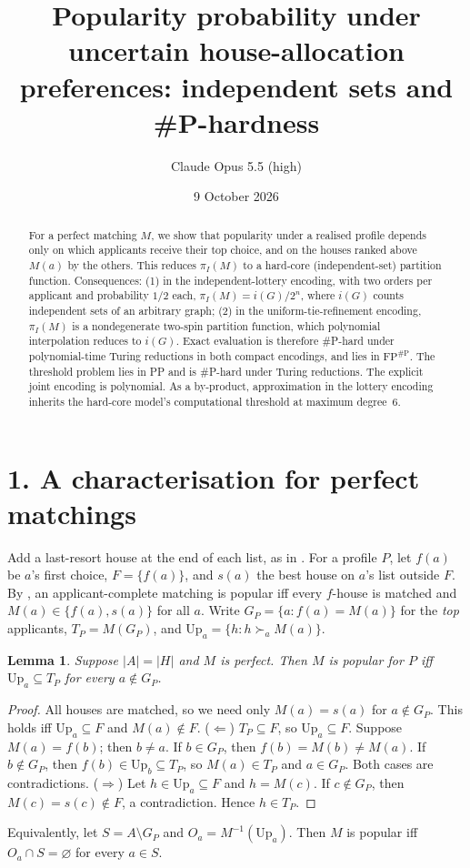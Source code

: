 \documentclass[11pt]{article}
\title{Popularity probability under uncertain house-allocation preferences: independent sets and \#P-hardness}
\author{Claude Opus 5.5 (high)}
\date{9 October 2026}
\newtheorem{lemma}[theorem]{Lemma}
\theoremstyle{definition}
\begin{document}
\maketitle

\begin{abstract}
For a perfect matching $M$, we show that popularity under a realised profile depends only on which applicants
receive their top choice, and on the houses ranked above $M(a)$ by the others. This reduces $\pi_I(M)$ to a hard-core
(independent-set) partition function. Consequences: (1) in the independent-lottery encoding, with two orders per applicant
and probability $1/2$ each, $\pi_I(M)=i(G)/2^n$, where $i(G)$ counts independent sets of an arbitrary graph; (2) in the
uniform-tie-refinement encoding, $\pi_I(M)$ is a nondegenerate two-spin partition function, which polynomial interpolation
reduces to $i(G)$. Exact evaluation is therefore \#P-hard under polynomial-time Turing reductions in both compact
encodings, and lies in $\mathrm{FP}^{\#\mathrm P}$. The threshold problem lies in PP and is \#P-hard under Turing
reductions. The explicit joint encoding is polynomial. As a by-product, approximation in the lottery encoding inherits the
hard-core model's computational threshold at maximum degree~$6$.
\end{abstract}

\section*{1. A characterisation for perfect matchings}
Add a last-resort house at the end of each list, as in \cite{aikm}. For a profile $P$, let $f(a)$ be $a$'s first choice,
$F=\{f(a)\}$, and $s(a)$ the best house on $a$'s list outside $F$. By \cite[Thm.~2.1]{aikm}, an applicant-complete matching
is popular iff every $f$-house is matched and $M(a)\in\{f(a),s(a)\}$ for all $a$. Write $G_P=\{a:f(a)=M(a)\}$ for the
\emph{top} applicants, $T_P=M(G_P)$, and $\mathrm{Up}_a=\{h:h\succ_aM(a)\}$.

\begin{lemma}\label{lem:char}
Suppose $|A|=|H|$ and $M$ is perfect. Then $M$ is popular for $P$ iff $\mathrm{Up}_a\subseteq T_P$ for every
$a\notin G_P$.
\end{lemma}
\begin{proof}
All houses are matched, so we need only $M(a)=s(a)$ for $a\notin G_P$. This holds iff $\mathrm{Up}_a\subseteq F$ and
$M(a)\notin F$.
($\Leftarrow$) $T_P\subseteq F$, so $\mathrm{Up}_a\subseteq F$. Suppose $M(a)=f(b)$; then $b\ne a$. If $b\in G_P$, then
$f(b)=M(b)\ne M(a)$. If $b\notin G_P$, then $f(b)\in\mathrm{Up}_b\subseteq T_P$, so $M(a)\in T_P$ and $a\in G_P$. Both cases are contradictions.
($\Rightarrow$) Let $h\in\mathrm{Up}_a\subseteq F$ and $h=M(c)$. If $c\notin G_P$, then $M(c)=s(c)\notin F$, a
contradiction. Hence $h\in T_P$.
\end{proof}
Equivalently, let $S=A\setminus G_P$ and $O_a=M^{-1}(\mathrm{Up}_a)$. Then $M$ is popular iff $O_a\cap S=\varnothing$ for every $a\in S$.
\end{document}
